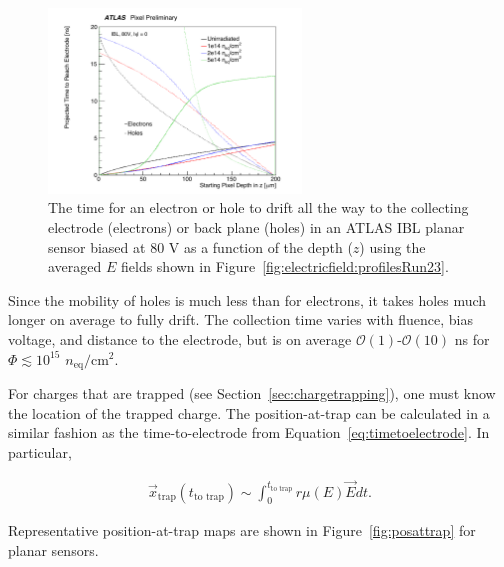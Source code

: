 \begin{figure}[!htpb]
\centering
\includegraphics[width=0.6\textwidth]{newtz_0fluence80V.pdf}
\caption{The time for an electron or hole to drift all the way to the collecting electrode (electrons) or back plane (holes) in an ATLAS IBL planar sensor biased at 80 V as a function of the depth ($z$) using the averaged $E$ fields shown in Figure~\ref{fig:electricfield:profilesRun23}.  }
\label{fig:timetoelectrode}
\end{figure}

Since the mobility of holes is much less than for electrons, it takes holes much longer on average to fully drift.  The collection time varies with fluence, bias voltage, and distance to the electrode, but is on average $\mathcal{O}(1)$-$\mathcal{O}(10)$ ns for $\Phi\lesssim 10^{15}$ $n_\text{eq}/\text{cm}^2$.





For charges that are trapped (see Section~\ref{sec:chargetrapping}), one must know the location of the trapped charge.  The position-at-trap can be calculated in a similar fashion as the time-to-electrode from Equation~\ref{eq:timetoelectrode}.  In particular, 

\begin{align}
\label{eq:traptimetoelectrode}
\vec{x}_\text{trap}(t_\text{to trap})\sim\int_\text{$0$}^\text{$t_\text{to trap}$}r\mu(E)\vec{E}dt.
\end{align}

\noindent Representative position-at-trap maps are shown in Figure~\ref{fig:posattrap} for planar sensors.  

